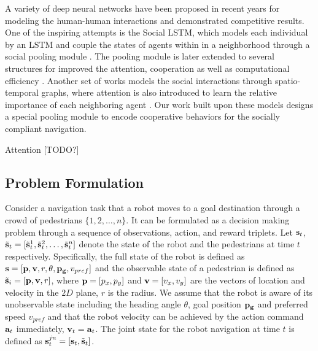 \documentclass[letterpaper, 10 pt, conference]{ieeeconf}  %
\begin{document}
A variety of deep neural networks have been proposed in recent years for modeling the human-human interactions and demonstrated competitive results\cite{becker_evaluation_2018}. One of the inspiring attempts is the Social LSTM, which models each individual by an LSTM and couple the states of agents within in a neighborhood through a social pooling module \cite{alahi_social_2016}. The pooling module is later extended to several structures for improved the attention, cooperation as well as computational efficiency \cite{fernando_soft_2017, gupta_social_2018}. Another set of works models the social interactions through spatio-temporal graphs, where attention is also introduced to learn the relative importance of each neighboring agent \cite{vemula_social_2017}. Our work built upon these models designs a special pooling module to encode cooperative behaviors for the socially compliant navigation. 

Attention \cite{vaswani_attention_2017}
[TODO?]

\subsection{Problem Formulation}

Consider a navigation task that a robot moves to a goal destination through a crowd of pedestrians $\{1,2,\dots,n\}$. It can be formulated as a decision making problem through a sequence of observations, action, and reward triplets\cite{chen_decentralized_2016,chen_socially_2017,everett_motion_2018}. Let $\bold{s}_t $, $\tilde{\bold{s}}_t = [\tilde{\bold{s}}_t^1, \tilde{\bold{s}}_t^2, \dots, \tilde{\bold{s}}_t^n]$ denote the state of the robot and the pedestrians at time $t$ respectively. Specifically, the full state of the robot is defined as $ \bold{s} = [\bold{p}, \bold{v}, r, \theta, \bold{p_g}, v_{pref}]$ and the observable state of a pedestrian is defined as $ \tilde{\bold{s}}_i = [\bold{p}, \bold{v}, r]$, where $\bold{p}=[p_x,p_y]$ and $\bold{v}=[v_x,v_y]$ are the vectors of location and velocity in the $2D$ plane, $r$ is the radius. We assume that the robot is aware of its unobservable state including the heading angle $\theta$, goal position $\bold{p_g}$ and preferred speed $v_{pref}$ and that the robot velocity can be achieved by the action command $\bold{a}_t$ immediately, $\bold{v}_t = \bold{a}_t$. The joint state for the robot navigation at time $t$ is defined as $\bold{s}_t^{jn} = [\bold{s}_t, \tilde{\bold{s}}_t]$. 
\end{document}
